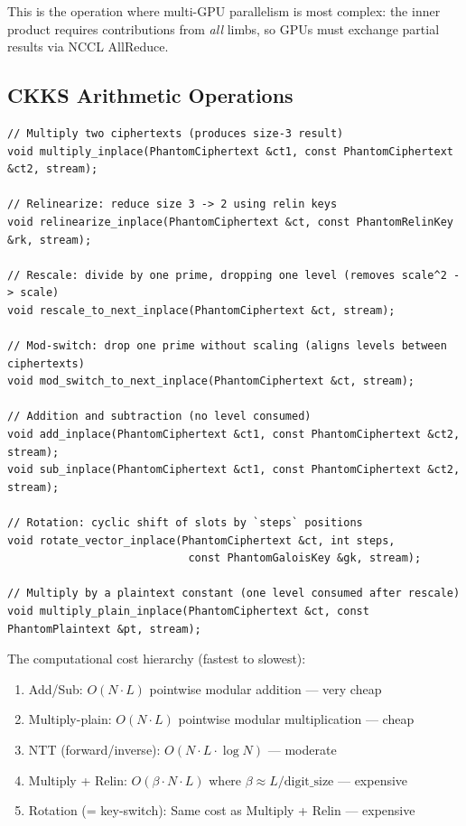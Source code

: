 \documentclass[11pt,letterpaper]{article}
\begin{document}
This is the operation where multi-GPU parallelism is most complex: the inner product requires
contributions from \emph{all} limbs, so GPUs must exchange partial results via NCCL AllReduce.

\subsection{CKKS Arithmetic Operations}

\begin{lstlisting}[style=cpp, caption=Core CKKS operations available in Phantom (evaluate.cuh)]
// Multiply two ciphertexts (produces size-3 result)
void multiply_inplace(PhantomCiphertext &ct1, const PhantomCiphertext &ct2, stream);

// Relinearize: reduce size 3 -> 2 using relin keys
void relinearize_inplace(PhantomCiphertext &ct, const PhantomRelinKey &rk, stream);

// Rescale: divide by one prime, dropping one level (removes scale^2 -> scale)
void rescale_to_next_inplace(PhantomCiphertext &ct, stream);

// Mod-switch: drop one prime without scaling (aligns levels between ciphertexts)
void mod_switch_to_next_inplace(PhantomCiphertext &ct, stream);

// Addition and subtraction (no level consumed)
void add_inplace(PhantomCiphertext &ct1, const PhantomCiphertext &ct2, stream);
void sub_inplace(PhantomCiphertext &ct1, const PhantomCiphertext &ct2, stream);

// Rotation: cyclic shift of slots by `steps` positions
void rotate_vector_inplace(PhantomCiphertext &ct, int steps,
                            const PhantomGaloisKey &gk, stream);

// Multiply by a plaintext constant (one level consumed after rescale)
void multiply_plain_inplace(PhantomCiphertext &ct, const PhantomPlaintext &pt, stream);
\end{lstlisting}

The computational cost hierarchy (fastest to slowest):
\begin{enumerate}
  \item Add/Sub: $O(N \cdot L)$ pointwise modular addition --- very cheap
  \item Multiply-plain: $O(N \cdot L)$ pointwise modular multiplication --- cheap
  \item NTT (forward/inverse): $O(N \cdot L \cdot \log N)$ --- moderate
  \item Multiply + Relin: $O(\beta \cdot N \cdot L)$ where $\beta \approx L/\text{digit\_size}$ --- expensive
  \item Rotation (= key-switch): Same cost as Multiply + Relin --- expensive
\end{enumerate}
\end{document}
